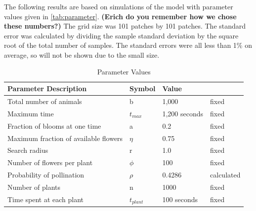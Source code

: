 

The following results are based on simulations of the model with parameter values given in
\autoref{tab:parameter}. {\bf (Erich do you remember how we chose these numbers?)}  The grid size was 101 patches by 101 patches.
The standard error was calculated by dividing the sample standard deviation by the square root of
the total number of samples.   The standard errors were all less than 1\% on average, so will not be
shown due to the small size.

\begin{table}
  \begin{tabular}{|l|l|l|l|}
    \hline
    Parameter Description & Symbol & Value &  \\ \hline  \label{parameter}
    Total number of animals & b & 1,000 & fixed  \\ \hline
    Maximum time & $t_{max}$ & 1,200 seconds & fixed \\ \hline
    Fraction of blooms at one time & a & 0.2 & fixed \\ \hline
    Maximum fraction of available flowers & $\eta$ & 0.75 & fixed \\ \hline
    Search radius & r & 1.0 & fixed \\ \hline
    Number of flowers per plant & $\phi$ & 100 & fixed \\ \hline
    Probability of pollination   & $\rho$ & 0.4286 & calculated \\ \hline
    Number of plants & n & 1000 & fixed \\ \hline
    Time spent at each plant & $t_{plant}$ & 100 seconds & fixed \\ \hline
  \end{tabular}
  \caption{Parameter Values}
  \label{tab:parameter}
\end{table}



